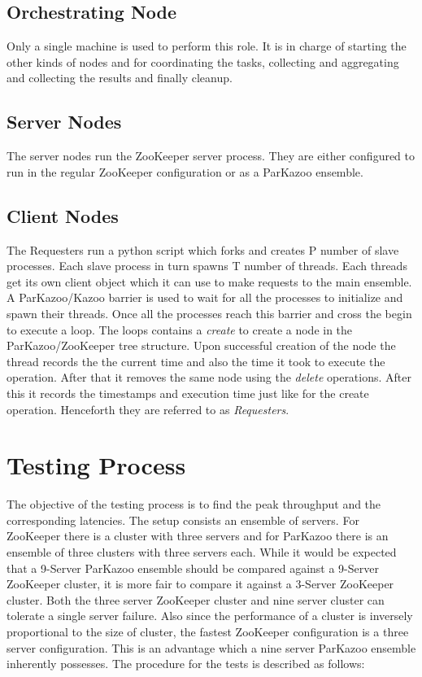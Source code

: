 \subsection{Orchestrating Node}
Only a single machine is used to perform this role. It is in charge of starting the other kinds of nodes and for coordinating the tasks, collecting and aggregating and collecting the results and finally cleanup.
\subsection{Server Nodes}
The server nodes run the ZooKeeper server process. They are either configured to run in the regular ZooKeeper configuration or as a ParKazoo ensemble.
\subsection{Client Nodes}
The Requesters run a python script which forks and creates P number of slave processes. Each slave process in turn spawns T number of threads. Each threads get its own client object which it can use to make requests to the main ensemble. A ParKazoo/Kazoo barrier is used to wait for all the processes to initialize and spawn their threads. Once all the processes reach this barrier and cross the begin to execute a loop. The loops contains a \textit{create} to create a node in the ParKazoo/ZooKeeper tree structure. Upon successful creation of the node the thread records the the current time and also the time it took to execute the operation. After that it removes the same node using the \textit{delete} operations. After this it records the timestamps and execution time just like for the create operation. Henceforth they are referred to as \textit{Requesters}. 









\section{Testing Process}
The objective of the testing process is to find the peak throughput and the corresponding latencies. The setup consists an ensemble of servers. For ZooKeeper there is a cluster with three servers and for ParKazoo there is an ensemble of three clusters with three servers each. While it would be expected that a 9-Server ParKazoo ensemble should be compared against a 9-Server ZooKeeper cluster, it is more fair to compare it against a 3-Server ZooKeeper cluster. Both the three server ZooKeeper cluster and nine server cluster can tolerate a single server failure. Also since the performance of a cluster is inversely proportional to the size of cluster, the fastest ZooKeeper configuration is a three server configuration. This is an advantage which a nine server ParKazoo ensemble inherently possesses. The procedure for the tests is described as follows:

